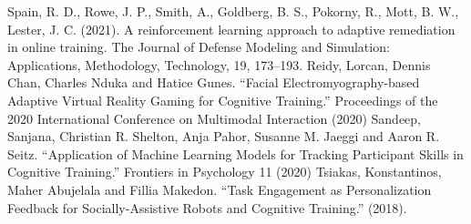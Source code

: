 \documentclass[12pt]{article}
\begin{document}
\begin{thebibliography}{99}
        Spain, R. D., Rowe, J. P., Smith, A., Goldberg, B. S., Pokorny, R., Mott, B. W., Lester, J. C. (2021). A reinforcement learning approach to adaptive remediation in online training. The Journal of Defense Modeling and Simulation: Applications, Methodology, Technology, 19, 173–193. 
        Reidy, Lorcan, Dennis Chan, Charles Nduka and Hatice Gunes. “Facial Electromyography-based Adaptive Virtual Reality Gaming for Cognitive Training.” Proceedings of the 2020 International Conference on Multimodal Interaction (2020)
        Sandeep, Sanjana, Christian R. Shelton, Anja Pahor, Susanne M. Jaeggi and Aaron R. Seitz. “Application of Machine Learning Models for Tracking Participant Skills in Cognitive Training.” Frontiers in Psychology 11 (2020)
        Tsiakas, Konstantinos, Maher Abujelala and Fillia Makedon. “Task Engagement as Personalization Feedback for Socially-Assistive Robots and Cognitive Training.” (2018).      
        
    \end{thebibliography}
\end{document}
